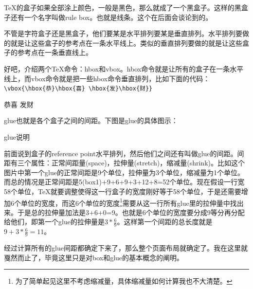 \documentclass[11pt,oneside]{book}
\begin{document}
\begin{common-format}
\TeX 的盒子如果全部涂上颜色，一般是黑色，那么就成了一个黑盒子。这样的黑盒子还有一个名字叫做rule box。也就是线条。这个在后面会谈论到的。

不管是字符盒子还是黑盒子，他们要某是水平排列要某是垂直排列。水平排列要做的就是让这些盒子的参考点在一条水平线上。类似的垂直排列要做的就是让这些盒子的参考点在一条垂直线上。

好吧，介绍两个\TeX 命令：hbox和vbox。hbox命令就是让所有的盒子在一条水平线上，而vbox命令就是把一些hbox命令垂直排列，比如下面的代码：\\
\verb+\vbox{\hbox{恭}\hbox{喜} \hbox{发}\hbox{财}}+

\vbox{\hbox{恭}\hbox{喜} \hbox{发}\hbox{财}}

glue也就是各个盒子之间的间距。下图是glue的具体图示：
\begin{linefig}{glue说明}
\label{fig:glue说明}
\end{linefig}
前面说到盒子的reference point水平排列，然后他们之间还有叫做glue的间距。间距有三个属性：正常间距量(space)，拉伸量(stretch)，缩减量(shrink)。比如这个图片中第一个glue的正常间距是9个单位，拉伸量为3个单位，缩减量为1个单位。而总的情况是正常间距是5(box1)+9+6+9+3+12+8=52个单位。现在假设一行宽58个单位，\TeX 就要调整使得这一行盒子的宽度刚好等于58个单位，于是还需要增加6个单位的宽度，而这6个单位的宽度\footnote{为了简单起见这里不考虑缩减量，具体缩减量如何计算我也不大清楚。}需要从这一行所有glue里的拉伸量中找出来。于是总的拉伸量加法是3+6+0=9。也就是6个单位的宽度要分成9等分再分配给他们，即第一个glue的拉伸量是$3*\frac { 6 }{ 9 } $。这样第一个间距的总长度就是$9+3*\frac { 6 }{ 9 } =11$。

经过计算所有的glue间距都确定下来了，那么整个页面布局就确定了。我在这里就戛然而止了，毕竟这里只是对box和glue的基本概念的阐明。

%
%
%


\end{common-format}
\end{document}
